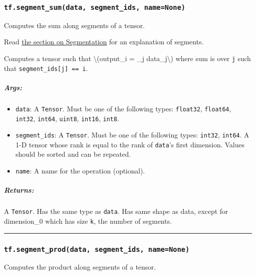 \subsubsection{\texorpdfstring{\texttt{tf.segment\_sum(data,\ segment\_ids,\ name=None)}
}{tf.segment\_sum(data, segment\_ids, name=None) }}\label{tf.segmentux5fsumdata-segmentux5fids-namenone}

Computes the sum along segments of a tensor.

Read \href{../../api_docs/python/math_ops.md\#segmentation}{the section
on Segmentation} for an explanation of segments.

Computes a tensor such that \textbackslash{}(output\_i = \sum\_j
data\_j\textbackslash{}) where sum is over \texttt{j} such that
\texttt{segment\_ids{[}j{]}\ ==\ i}.

\subparagraph{Args: }\label{args-46}

\begin{itemize}
\tightlist
\item
  \texttt{data}: A \texttt{Tensor}. Must be one of the following types:
  \texttt{float32}, \texttt{float64}, \texttt{int32}, \texttt{int64},
  \texttt{uint8}, \texttt{int16}, \texttt{int8}.
\item
  \texttt{segment\_ids}: A \texttt{Tensor}. Must be one of the following
  types: \texttt{int32}, \texttt{int64}. A 1-D tensor whose rank is
  equal to the rank of \texttt{data}'s first dimension. Values should be
  sorted and can be repeated.
\item
  \texttt{name}: A name for the operation (optional).
\end{itemize}

\subparagraph{Returns: }\label{returns-46}

A \texttt{Tensor}. Has the same type as \texttt{data}. Has same shape as
data, except for dimension\_0 which has size \texttt{k}, the number of
segments.

\begin{center}\rule{0.5\linewidth}{\linethickness}\end{center}

\subsubsection{\texorpdfstring{\texttt{tf.segment\_prod(data,\ segment\_ids,\ name=None)}
}{tf.segment\_prod(data, segment\_ids, name=None) }}\label{tf.segmentux5fproddata-segmentux5fids-namenone}

Computes the product along segments of a tensor.

